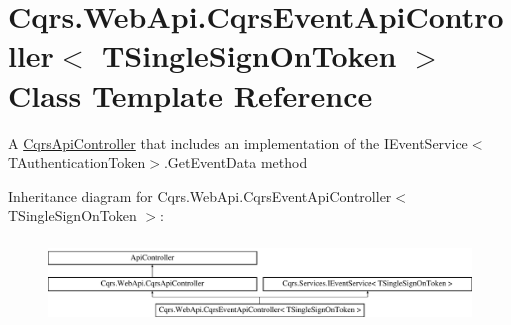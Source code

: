 \hypertarget{classCqrs_1_1WebApi_1_1CqrsEventApiController}{}\section{Cqrs.\+Web\+Api.\+Cqrs\+Event\+Api\+Controller$<$ T\+Single\+Sign\+On\+Token $>$ Class Template Reference}
\label{classCqrs_1_1WebApi_1_1CqrsEventApiController}


A \hyperlink{classCqrs_1_1WebApi_1_1CqrsApiController}{Cqrs\+Api\+Controller} that includes an implementation of the I\+Event\+Service$<$\+T\+Authentication\+Token$>$.\+Get\+Event\+Data method  


Inheritance diagram for Cqrs.\+Web\+Api.\+Cqrs\+Event\+Api\+Controller$<$ T\+Single\+Sign\+On\+Token $>$\+:\begin{figure}[H]
\begin{center}
\leavevmode
\includegraphics[height=2.252011cm]{classCqrs_1_1WebApi_1_1CqrsEventApiController}
\end{center}
\end{figure}
